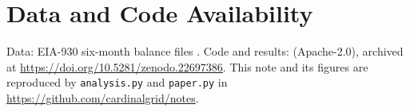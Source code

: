 \documentclass[conference]{IEEEtran}
\begin{document}
\section*{Data and Code Availability}
Data: EIA-930 six-month balance files \cite{eia930monitor}. Code and results: \cite{guerra2026scorecard} (Apache-2.0), archived at \url{https://doi.org/10.5281/zenodo.22697386}. This note and its figures are reproduced by \texttt{analysis.py} and \texttt{paper.py} in \url{https://github.com/cardinalgrid/notes}.



\end{document}
